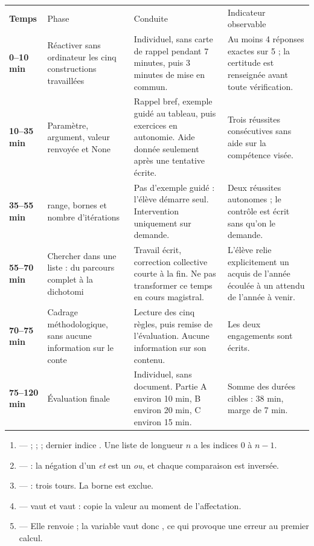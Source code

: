 \documentclass[10pt,a4paper]{article}
\begin{document}
\newpage{}
\par\noindent\begin{tabularx}{\linewidth}{>{\bfseries}p{18mm} p{34mm} X X}
\rowcolor{Navy}\color{white}Temps & \color{white}Phase & \color{white}Conduite & \color{white}Indicateur observable \\
0--10 min & Réactiver sans ordinateur les cinq constructions travaillées & Individuel, sans carte de rappel pendant 7 minutes, puis 3 minutes de mise en commun. & Au moins 4 réponses exactes sur 5 ; la certitude est renseignée avant toute vérification. \\
10--35 min & Paramètre, argument, valeur renvoyée et None & Rappel bref, exemple guidé au tableau, puis exercices en autonomie. Aide donnée seulement après une tentative écrite. & Trois réussites consécutives sans aide sur la compétence visée. \\
35--55 min & range, bornes et nombre d'itérations & Pas d'exemple guidé : l'élève démarre seul. Intervention uniquement sur demande. & Deux réussites autonomes ; le contrôle est écrit sans qu'on le demande. \\
55--70 min & Chercher dans une liste : du parcours complet à la dichotomi & Travail écrit, correction collective courte à la fin. Ne pas transformer ce temps en cours magistral. & L'élève relie explicitement un acquis de l'année écoulée à un attendu de l'année à venir. \\
70--75 min & Cadrage méthodologique, sans aucune information sur le conte & Lecture des cinq règles, puis remise de l'évaluation. Aucune information sur son contenu. & Les deux engagements sont écrits. \\
75--120 min & Évaluation finale & Individuel, sans document. Partie A environ 10 min, B environ 20 min, C environ 15 min. & Somme des durées cibles : 38 min, marge de 7 min. \\
\end{tabularx}
\newpage{}
\begin{enumerate}
\item {} ---  ;  ;  ; dernier indice . Une liste de longueur $n$ a les indices $0$ à $n-1$.
\item {} ---  : la négation d'un \emph{et} est un \emph{ou}, et chaque comparaison est inversée.
\item {} ---  : trois tours. La borne  est exclue.
\item {} ---  vaut  et  vaut  :  copie la valeur au moment de l'affectation.
\item {} --- Elle renvoie  ; la variable vaut donc , ce qui provoque une erreur au premier calcul.
\end{enumerate}
\end{document}
